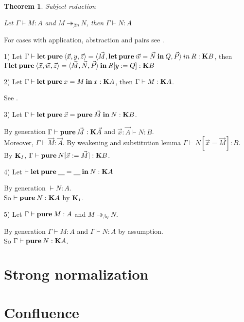 \documentclass[a4paper]{article}
\newtheorem{theorem}{Theorem}
\begin{document}
\begin{theorem} Subject reduction

  Let $\Gamma \vdash M : A$ and $M \twoheadrightarrow_{\beta \eta} N$, then $\Gamma \vdash N : A$

\end{theorem}

For cases with application, abstraction and pairs see \cite{Morten} \cite{Pierce}.

1)
  Let $\Gamma \vdash {\bf let \: pure \:} \langle \vec{x}, y, \vec{z} \rangle = \langle \vec{M}, {\bf let \: pure \: } \vec{w} = \vec{N} {\bf \: in \: } Q, \vec{P} \rangle {\: in \:} R : {\bf K}B$,
  then $\Gamma {\bf let \: pure \:} \langle \vec{x}, \vec{w}, \vec{z} \rangle = \langle \vec{M}, \vec{N}, \vec{P} \rangle \: { \bf in } \: R [y := Q] : {\bf K}B$

2) Let $\Gamma \vdash {\bf let \: pure \:} x = M {\: \bf in \: } x : {\bf K}A$, then $\Gamma \vdash M : {\bf K}A$.

See \cite{ModalK}.

3) Let $\Gamma \vdash {\bf let \: pure \:} \vec{x} = {\bf pure \:} \vec{M} {\: \bf in \:} N : {\bf K}B$.

By generation $\Gamma \vdash {\bf pure \:} \vec{M} : {\bf K}\vec{A}$ and $\vec{x} : \vec{A} \vdash N : B$.
\\ Moreover, $\Gamma \vdash \vec{M} : \vec{A}$. By weakening and substitution lemma $\Gamma \vdash N [\vec{x} = \vec{M}] : B$.
\\ By ${\bf K}_I$, $\Gamma \vdash {\bf pure \:} N [\vec{x} := \vec{M}] : {\bf K}B$.

4) Let $\vdash {\bf let \: pure \:} \underline{\quad} = \underline{\quad} {\: \bf in \:} N : {\bf K}A$

By generation $\vdash N : A$. \\ So $\vdash {\bf pure \:} N : {\bf K}A$ by ${\bf K}_I$.

5) Let $\Gamma \vdash {\bf pure \:} M : A$ and $M \twoheadrightarrow_{\beta \eta} N$.

By generation $\Gamma \vdash M : A$ and $\Gamma \vdash N : A$ by assumption.
\\ So $\Gamma \vdash {\bf pure \:} N : {\bf K}A$.


\section{Strong normalization}

\section{Confluence}
\end{document}
